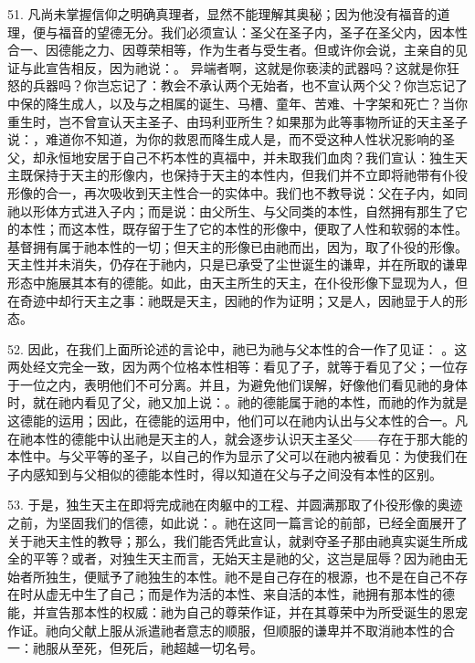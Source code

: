 51. 凡尚未掌握信仰之明确真理者，显然不能理解其奥秘；因为他没有福音的道理，便与福音的望德无分。我们必须宣认：圣父在圣子内，圣子在圣父内，因本性合一、因德能之力、因尊荣相等，作为生者与受生者。但或许你会说，主亲自的见证与此宣告相反，因为祂说：。 异端者啊，这就是你亵渎的武器吗？这就是你狂怒的兵器吗？你岂忘记了：教会不承认两个无始者，也不宣认两个父？你岂忘记了中保的降生成人，以及与之相属的诞生、马槽、童年、苦难、十字架和死亡？当你重生时，岂不曾宣认天主圣子、由玛利亚所生？如果那为此等事物所证的天主圣子说：，难道你不知道，为你的救恩而降生成人是，而不受这种人性状况影响的圣父，却永恒地安居于自己不朽本性的真福中，并未取我们血肉？我们宣认：独生天主既保持于天主的形像内，也保持于天主的本性内，但我们并不立即将祂带有仆役形像的合一，再次吸收到天主性合一的实体中。我们也不教导说：父在子内，如同祂以形体方式进入子内；而是说：由父所生、与父同类的本性，自然拥有那生了它的本性；而这本性，既存留于生了它的本性的形像中，便取了人性和软弱的本性。基督拥有属于祂本性的一切；但天主的形像已由祂而出，因为，取了仆役的形像。天主性并未消失，仍存在于祂内，只是已承受了尘世诞生的谦卑，并在所取的谦卑形态中施展其本有的德能。如此，由天主所生的天主，在仆役形像下显现为人，但在奇迹中却行天主之事：祂既是天主，因祂的作为证明；又是人，因祂显于人的形态。\par

52. 因此，在我们上面所论述的言论中，祂已为祂与父本性的合一作了见证： 。这两处经文完全一致，因为两个位格本性相等：看见了子，就等于看见了父；一位存于一位之内，表明他们不可分离。并且，为避免他们误解，好像他们看见祂的身体时，就在祂内看见了父，祂又加上说：。祂的德能属于祂的本性，而祂的作为就是这德能的运用；因此，在德能的运用中，他们可以在祂内认出与父本性的合一。凡在祂本性的德能中认出祂是天主的人，就会逐步认识天主圣父——存在于那大能的本性中。与父平等的圣子，以自己的作为显示了父可以在祂内被看见：为使我们在子内感知到与父相似的德能本性时，得以知道在父与子之间没有本性的区别。\par

53. 于是，独生天主在即将完成祂在肉躯中的工程、并圆满那取了仆役形像的奥迹之前，为坚固我们的信德，如此说：。祂在这同一篇言论的前部，已经全面展开了关于祂天主性的教导；那么，我们能否凭此宣认，就剥夺圣子那由祂真实诞生所成全的平等？或者，对独生天主而言，无始天主是祂的父，这岂是屈辱？因为祂由无始者所独生，便赋予了祂独生的本性。祂不是自己存在的根源，也不是在自己不存在时从虚无中生了自己；而是作为活的本性、来自活的本性，祂拥有那本性的德能，并宣告那本性的权威：祂为自己的尊荣作证，并在其尊荣中为所受诞生的恩宠作证。祂向父献上服从派遣祂者意志的顺服，但顺服的谦卑并不取消祂本性的合一：祂服从至死，但死后，祂超越一切名号。\par

